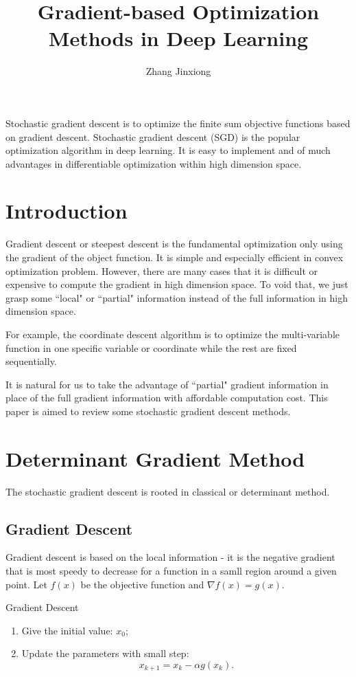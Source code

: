\documentclass[11pt]{article} %
\title{Gradient-based Optimization Methods in Deep Learning}
\author{Zhang Jinxiong}
\begin{document}
\maketitle

\abstract
Stochastic gradient descent is to optimize the finite sum objective functions based on gradient descent.
Stochastic gradient descent (SGD) is the popular optimization algorithm in deep learning.
It is easy to implement and of much advantages in differentiable optimization within high dimension space.
\section{Introduction}

Gradient descent or steepest descent is the fundamental optimization only using the gradient of the object function.
 It is simple and especially efficient in convex optimization problem.
However, there are many cases that it is difficult or expensive to compute the gradient in high dimension space.
To void that, we just grasp some ``local" or ``partial" information instead of the full information in high dimension space.

For example, the coordinate descent algorithm is to optimize the multi-variable function in one specific variable or coordinate while the rest are fixed sequentially.

It is natural for us to take the advantage of ``partial" gradient information in place of the full gradient information with affordable computation cost.
This paper is aimed to review some stochastic gradient descent methods.


\section{Determinant Gradient Method}
The stochastic gradient descent is rooted in classical or determinant method.

\subsection{Gradient Descent}
Gradient descent is based on the local information -  it is  the negative gradient that is most speedy to decrease for a function in a samll region around a given point.
Let $f(x)$ be the objective function and $\nabla f(x) = g(x)$.
\begin{algorithm}[htb]
\caption{Gradient Descent}
\label{GD}
\begin{enumerate}
\item Give the initial value: $x_0$;
\item Update the parameters with small step: $$x_{k+1}=x_{k} - \alpha g(x_{k}).$$
\end{enumerate}

\end{algorithm}
\end{document}
